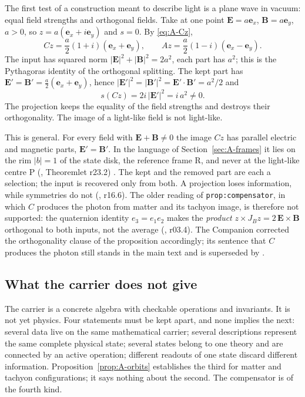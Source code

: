 The first test of a construction meant to describe light is a plane wave in vacuum: equal field
strengths and orthogonal fields. Take at one point $\mathbf E=a\mathbf e_x$, $\mathbf B=a\mathbf e_y$,
$a>0$, so $z=a(\mathbf e_x+i\mathbf e_y)$ and $s=0$. By \eqref{eq:A-Cz},
\begin{equation}
Cz=\frac a2(1+i)(\mathbf e_x+\mathbf e_y),\qquad Az=\frac a2(1-i)(\mathbf e_x-\mathbf e_y).
\label{eq:A-wave}
\end{equation}
The input has squared norm $|\mathbf E|^2+|\mathbf B|^2=2a^2$, each part has $a^2$; this is the
Pythagoras identity of the orthogonal splitting. The kept part has
$\mathbf E'=\mathbf B'=\tfrac a2(\mathbf e_x+\mathbf e_y)$, hence
$|\mathbf E'|^2=|\mathbf B'|^2=\mathbf E'\cdot\mathbf B'=a^2/2$ and
\begin{equation}
s(Cz)=2i\,|\mathbf E'|^2=i\,a^2\neq0 .
\label{eq:A-sC}
\end{equation}
The projection keeps the equality of the field strengths and destroys their orthogonality. The image
of a light-like field is not light-like.

This is general. For every field with $\mathbf E+\mathbf B\neq0$ the image $Cz$ has parallel electric
and magnetic parts, $\mathbf E'=\mathbf B'$. In the language of Section~\ref{sec:A-frames} it lies on
the rim $|b|=1$ of the state disk, the reference frame R, and never at the light-like centre P
(, Theoremlet r23.2) \Established. The kept and the removed part are each a selection; the
input is recovered only from both. A projection loses information, while symmetries do not
(, r16.6). The older reading of \texttt{prop:compensator}, in which $C$ produces the photon
from matter and its tachyon image, is therefore not supported: the quaternion identity $e_3=e_1e_2$
makes the \emph{product} $z\times J_Bz=2\,\mathbf E\times\mathbf B$ orthogonal to both inputs, not the
average (, r03.4). The Companion corrected the orthogonality clause of the proposition accordingly; its sentence
that $C$ produces the photon still stands in the main text and is superseded by .

\subsection{What the carrier does not give}
\label{sec:A-limits}

The carrier is a concrete algebra with checkable operations and invariants. It is not yet physics.
Four statements must be kept apart, and none implies the next: several data live on the same
mathematical carrier; several descriptions represent the same complete physical state; several states
belong to one theory and are connected by an active operation; different readouts of one state discard
different information. Proposition~\ref{prop:A-orbits} establishes the third for matter and tachyon
configurations; it says nothing about the second. The compensator is of the fourth kind.

